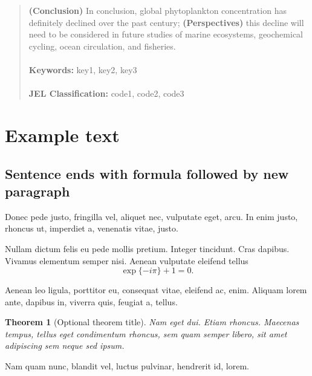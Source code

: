 \documentclass[
	12pt, %
	a4paper, %
	]{article}
\theoremstyle{break} %
\newtheorem{theorem}{Theorem}
\begin{document}
\begin{titlepage}
\begin{abstract}
	\textbf{(Conclusion)} In conclusion, global phytoplankton concentration has definitely declined over the past century; 
	\textbf{(Perspectives)} this decline will need to be considered	in future studies of marine ecosystems, geochemical cycling,
	ocean circulation, and fisheries.\\
	\vspace{0in}\\
	\noindent\textbf{Keywords:} key1, key2, key3\\
	\vspace{0in}\\
	\noindent\textbf{JEL Classification:} code1, code2, code3\\
	\bigskip
\end{abstract}
\thispagestyle{empty}
\end{titlepage}

\pagebreak \newpage

\setcounter{page}{2}
\onehalfspacing

\section{Example text}\label{sec:examples}
\subsection{Sentence ends with formula followed by new paragraph}
Donec pede justo, fringilla vel, aliquet nec, vulputate eget, arcu. In enim justo, rhoncus ut, imperdiet a, venenatis vitae, justo. 

Nullam dictum felis eu pede mollis pretium. Integer tincidunt. Cras dapibus. Vivamus elementum semper nisi. Aenean vulputate eleifend tellus
\begin{equation}
\exp\{-i\pi\} + 1 = 0.
\end{equation}

Aenean leo ligula, porttitor eu, consequat vitae, eleifend ac, enim. Aliquam lorem ante, dapibus in, viverra quis, feugiat a, tellus.
\begin{theorem}[Optional theorem title]
	Nam eget dui. Etiam rhoncus. Maecenas tempus, tellus eget condimentum rhoncus, sem quam semper libero, sit amet adipiscing sem neque sed ipsum.
\end{theorem} Nam quam nunc, blandit vel, luctus pulvinar, hendrerit id, lorem.
\end{document}
